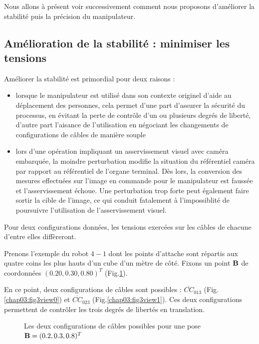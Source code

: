 Nous allons \`a pr\'esent voir successivement comment nous proposons 
d'am\'eliorer la stabilit\'e puis la pr\'ecision du manipulateur.
 

\subsection{Am\'elioration de la stabilit\'e : minimiser les tensions}

Am\'eliorer la stabilit\'e est primordial pour deux raisons :
\begin{itemize}
 \item lorsque le manipulateur est utilis\'e dans son contexte originel d'aide 
au d\'eplacement des personnes, cela permet d'une part d'assurer la 
s\'ecurit\'e du processus, en \'evitant la perte de contr\^ole d'un ou 
plusieurs degr\'es de libert\'e, d'autre part l'aisance de l'utilisation en 
n\'egociant les changements de configurations de c\^ables de mani\`ere souple
\item lors d'une op\'eration impliquant un asservissement visuel avec cam\'era 
embarqu\'ee, la moindre perturbation modifie la situation du r\'ef\'erentiel 
cam\'era par rapport au r\'ef\'erentiel de l'organe terminal. D\`es lors, la 
conversion des mesures effectu\'ees sur l'image en commande pour le 
manipulateur est fauss\'ee et l'asservissement \'echoue. Une perturbation trop 
forte peut \'egalement faire sortir la cible de l'image, ce qui conduit 
fatalement \`a l'impossiblit\'e de poursuivre l'utilisation de l'asservissement 
visuel.
\end{itemize} 

Pour deux configurations donn\'ees, les tensions exerc\'ees sur les c\^ables de 
chacune d'entre elles diff\`ereront.

Prenons l'exemple du robot $4-1$ dont les points d'attache sont r\'epartis aux 
quatre coins les plus hauts d'un cube d'un m\`etre de c\^ot\'e. Fixons un point 
${\bf B}$ de coordonn\'ees $(0.20, 0.30, 0.80)^T$ (Fig.\ref{chap03:fig3}).

En ce point, deux configurations de c\^ables sont possibles : 
$\overline{CC}_{013}$ (Fig.\ref{chap03:fig3view0}) et 
$\overline{CC}_{023}$ (Fig.\ref{chap03:fig3view1}). Ces deux configurations 
permettent de contr\^oler les trois degr\'es de libert\'es en translation.

\begin{figure}[htp]
  \centering
  \hfill
    \caption{\footnotesize{Les deux configurations de c\^ables possibles pour 
une pose ${\bf B} = (0.2, 0.3, 0.8)^T$}}
\label{chap03:fig3}
\end{figure}


